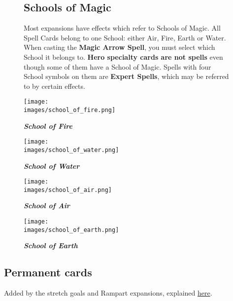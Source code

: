
\begin{figure}[h]
  \begin{minipage}[t]{0.48\textwidth}
    \vspace{0pt}
    \subsection*{Schools of Magic}
    Most expansions have effects which refer to Schools of Magic.
    All Spell Cards belong to one School: either Air, Fire, Earth or Water.
    When casting the \textbf{Magic Arrow Spell}, you must select which School it belongs to.
    \textbf{Hero specialty cards are not spells} even though some of them have a School of Magic.
    Spells with four School symbols on them are \textbf{Expert Spells}, which may be referred to by certain effects.
  \end{minipage}
  \begin{minipage}[t]{0.48\textwidth}
    \vspace{0pt}
    \centering
      \centering
      \texttt{[image: \\images/school\_of\_fire.png]}
      \caption{{\textit{\textbf{\textcolor{darkcandyapplered}{School of Fire}}}}}
    \endminipage
      \centering
      \texttt{[image: \\images/school\_of\_water.png]}
      \caption{{\textit{\textbf{\textcolor{darkcandyapplered}{School of Water}}}}}
    \endminipage
    \hfill\allowbreak%
    \bigbreak
      \centering
      \texttt{[image: \\images/school\_of\_air.png]}
      \caption{{\textit{\textbf{\textcolor{darkcandyapplered}{School of Air}}}}}
    \endminipage
      \centering
      \texttt{[image: \\images/school\_of\_earth.png]}
      \caption{{\textit{\textbf{\textcolor{darkcandyapplered}{School of Earth}}}}}
    \endminipage
  \end{minipage}
\end{figure}

\subsection*{Permanent cards}
Added by the stretch goals and Rampart expansions, explained \hyperlink{Playerdecks}{here}.

